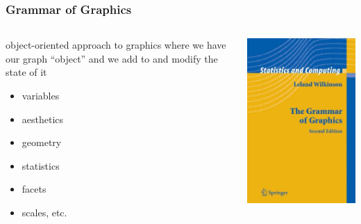 \documentclass{beamer}\usepackage{graphicx, color}
\begin{document}
\begin{frame}
  \frametitle{Grammar of Graphics}
  \begin{columns}
    \begin{column}{0.5\textwidth}
      object-oriented approach to graphics where we have our graph ``object'' and we add to and modify the state of it\\
      \begin{itemize}
        \item variables
        \item aesthetics
        \item geometry
        \item statistics
        \item facets
        \item scales, etc.
      \end{itemize}
    \end{column}
    \begin{column}{0.5\textwidth}
      \includegraphics[width = \textwidth, keepaspectratio = true]{figure/grammar}
    \end{column}
  \end{columns}

\end{frame}
\end{document}
